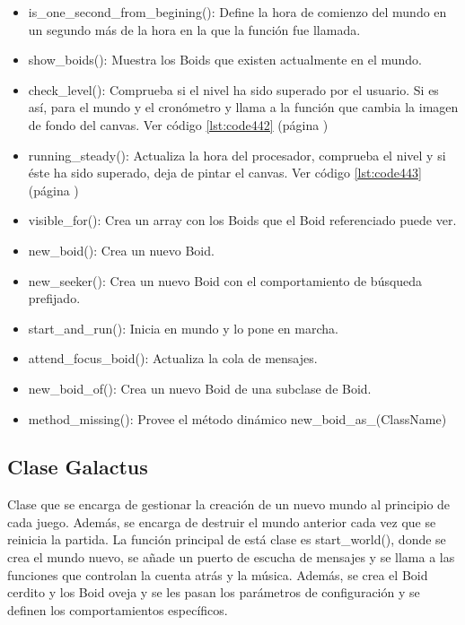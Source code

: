 \begin{itemize}
 \item is\_one\_second\_from\_begining():
Define la hora de comienzo del mundo en un segundo más de la hora en la que la función fue llamada.

 \item show\_boids():
Muestra los Boids que existen actualmente en el mundo.

 \item check\_level():
Comprueba si el nivel ha sido superado por el usuario. Si es así, para el mundo y el cronómetro y llama a la función que cambia la imagen 
de fondo del canvas. Ver código \ref{lst:code442} (página \pageref{lst:code442})

 \item running\_steady():
Actualiza la hora del procesador, comprueba el nivel y si éste ha sido superado, deja de pintar el canvas. Ver código \ref{lst:code443} (página \pageref{lst:code443})

 \item visible\_for():
Crea un array con los Boids que el Boid referenciado puede ver.

 \item new\_boid():
Crea un nuevo Boid.

 \item new\_seeker():
Crea un nuevo Boid con el comportamiento de búsqueda prefijado.

 \item start\_and\_run():
Inicia en mundo y lo pone en marcha.

 \item attend\_focus\_boid():
Actualiza la cola de mensajes.

 \item new\_boid\_of():
Crea un nuevo Boid de una subclase de Boid.

 \item method\_missing():
Provee el método dinámico new\_boid\_as\_(ClassName)
\end{itemize}

\pagebreak

\subsection{Clase Galactus}
\label{subsection:galactus}

Clase que se encarga de gestionar la creación de un nuevo mundo al principio de cada juego. Además, se encarga de destruir el mundo 
anterior cada vez que se reinicia la partida. La función principal de está clase es start\_world(), donde se crea el mundo nuevo, se añade 
un puerto de escucha de mensajes y se llama a las funciones que controlan la cuenta atrás y la música. Además, se crea el Boid cerdito y 
los Boid oveja y se les pasan los parámetros de configuración y se definen los comportamientos específicos.\\

